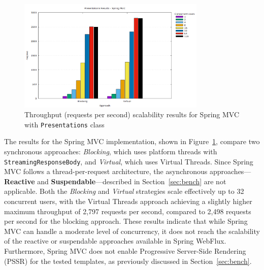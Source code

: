 \begin{figure}[h]
     \centering
     \includegraphics[width=0.8\textwidth]{./Graphs/presentations-springmvc-jmeter.png}
     \caption{Throughput (requests per second) scalability results for Spring MVC with \texttt{Presentations} class}\label{fig:presentations-springmvc-jmeter}
\end{figure}

The results for the Spring MVC implementation, shown in
Figure~\ref{fig:presentations-springmvc-jmeter}, compare two synchronous
approaches: \textit{Blocking}, which uses platform threads with
\texttt{StreamingResponseBody}, and \textit{Virtual}, which uses Virtual
Threads. Since Spring MVC follows a thread-per-request architecture, the
asynchronous approaches—\textbf{Reactive} and \textbf{Suspendable}—described in
Section~\ref{sec:bench} are not applicable. Both the \textit{Blocking} and
\textit{Virtual} strategies scale effectively up to 32 concurrent users, with
the Virtual Threads approach achieving a slightly higher maximum throughput of
2,797 requests per second, compared to 2,498 requests per second for the
blocking approach. These results indicate that while Spring MVC can handle a
moderate level of concurrency, it does not reach the scalability of the
reactive or suspendable approaches available in Spring WebFlux. Furthermore,
Spring MVC does not enable Progressive Server-Side Rendering (PSSR) for the
tested templates, as previously discussed in Section~\ref{sec:bench}.

